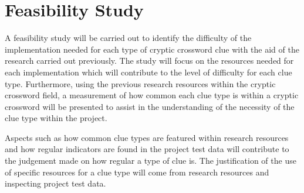 \section{Feasibility Study}

A feasibility study will be carried out to identify the difficulty of the
 implementation needed for each type of cryptic crossword clue with
 the aid of the research carried out previously. The study will focus
 on the resources needed for each implementation which will contribute
 to the level of difficulty for each clue type. Furthermore, using the 
previous research resources within the cryptic crossword field, a measurement
 of how common each clue type is within a cryptic crossword will be presented
 to assist in the understanding of the necessity of the clue type within the project.

Aspects such as how common clue types are featured within research
 resources and how regular indicators are found in the project test data
 will contribute to the judgement made on how regular a type of clue is. The
 justification of the use of specific resources for a clue type will come from
 research resources and inspecting project test data.

